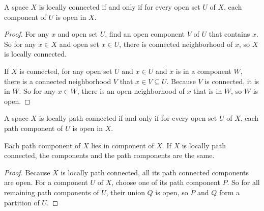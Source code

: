 \begin{theorem}
A space $X$ is locally connected if and only if for every open set $U$ of $X$, each component of $U$ is open in $X$.    
\end{theorem}
\begin{proof}
    For any $x$ and open set $U$, find an open component $V$ of $U$ that contains $x$. So for any $x \in X$ and open set $x \in U$, there is connected neighborhood of $x$, so $X$ is locally connected.
    
    If $X$ is connected, for any open set $U$ and $x \in U$ and $x$ is in a component $W$, there is a connected neighborhood $V$ that $x \in V \subseteq U$. Because $V$ is connected, it is in $W$. So for any $x \in W$, there is an open neighborhood of $x$ that is in $W$, so $W$ is open.
\end{proof}

\begin{theorem}
A space $X$ is locally path connected if and only if for every open set $U$ of $X$, each path component of $U$ is open in $X$.    
\end{theorem}

\begin{theorem}
    Each path component of $X$ lies in component of $X$. If $X$ is locally path connected, the components and the path components are the same.    
\end{theorem}
\begin{proof}
    Because $X$ is locally path connected, all its path connected components are open. For a component $U$ of $X$, choose one of its path component $P$. So for all remaining path components of $U$, their union $Q$ is open, so $P$ and $Q$ form a partition of $U$.
\end{proof}
















